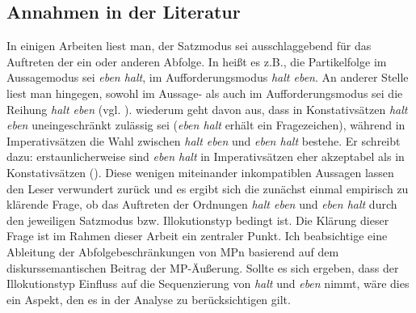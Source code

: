 \subsection{Annahmen in der Literatur}
\label{sec:anlit}
In einigen Arbeiten liest man, der Satzmodus  sei ausschlaggebend für das Auftreten der ein oder anderen Abfolge. In \citet[1542-1543]{Zifonun1997} heißt es z.B., die Partikelfolge im \glqq Aussagemodus\grqq{}  sei \textit{eben halt}, im   \glqq Aufforderungsmodus\grqq{} \textit{halt eben}. An anderer Stelle liest man hingegen, sowohl im Aussage- als auch im Aufforderungsmodus sei die Reihung \textit{halt eben} (vgl. \citealt[908-909]{Zifonun1997}). \citet[227/230/234]{Dahl1988} wiederum geht davon aus, dass in \glqq Konstativsätzen\grqq{} \textit{halt eben} uneingeschränkt zulässig sei (\textit{eben halt} erhält ein Fragezeichen), während in \glqq Imperativsätzen\grqq{} die Wahl zwischen \textit{halt eben} und \textit{eben halt} bestehe. Er schreibt dazu: \glqq erstaunlicherweise sind \textit{eben halt} in Imperativsätzen eher akzeptabel als in Konstativsätzen\grqq{} (\citealt[250]{Dahl1988}). Diese wenigen miteinander inkompatiblen Aussagen lassen den Leser verwundert zurück und es ergibt sich die zunächst einmal empirisch zu klärende Frage, ob das Auftreten der Ordnungen \textit{halt eben} und \textit{eben halt} durch den je\-weiligen Satzmodus bzw. Illokutionstyp bedingt ist. Die Klärung dieser Frage ist im Rahmen dieser Arbeit ein zentraler Punkt. Ich beabsichtige eine Ableitung der Abfolgebeschränkungen von MPn basierend auf dem diskurssemantischen Beitrag der MP-Äußerung. Sollte es sich ergeben, dass der Illokutionstyp Einfluss auf die Sequenzierung von \textit{halt} und \textit{eben} nimmt, wäre dies ein Aspekt, den es in der Analyse zu berücksichtigen gilt.

